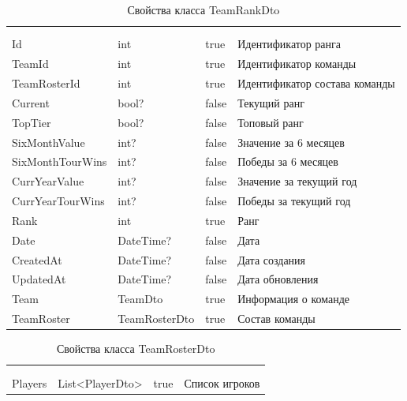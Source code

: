 \begin{xltabular}{\textwidth}{|X|X|X|X|}
	\caption{Свойства класса TeamRankDto}\label{table:TeamRankDto}\\ \hline
	 &  &  &  \\ \hline
	 &  &  &  \\ \hline
	\endfirsthead
	 \hline
	 &  &  &  \\ \hline
	\endhead
	Id & int & true & Идентификатор ранга \\ \hline
	TeamId & int & true & Идентификатор команды \\ \hline
	TeamRosterId & int & true & Идентификатор состава команды \\ \hline
	Current & bool? & false & Текущий ранг \\ \hline
	TopTier & bool? & false & Топовый ранг \\ \hline
	SixMonthValue & int? & false & Значение за 6 месяцев \\ \hline
	SixMonthTourWins & int? & false & Победы за 6 месяцев \\ \hline
	CurrYearValue & int? & false & Значение за текущий год \\ \hline
	CurrYearTourWins & int? & false & Победы за текущий год \\ \hline
	Rank & int & true & Ранг \\ \hline
	Date & DateTime? & false & Дата \\ \hline
	CreatedAt & DateTime? & false & Дата создания \\ \hline
	UpdatedAt & DateTime? & false & Дата обновления \\ \hline
	Team & TeamDto & true & Информация о команде \\ \hline
	TeamRoster & TeamRosterDto & true & Состав команды \\ \hline
\end{xltabular}

\begin{xltabular}{\textwidth}{|X|X|X|X|}
	\caption{Свойства класса TeamRosterDto}\label{table:TeamRosterDto}\\ \hline
	 &  &  &  \\ \hline
	 &  &  &  \\ \hline
	\endfirsthead
	 \hline
	 &  &  &  \\ \hline
	\endhead
	Players & List<PlayerDto> & true & Список игроков \\ \hline
\end{xltabular}

